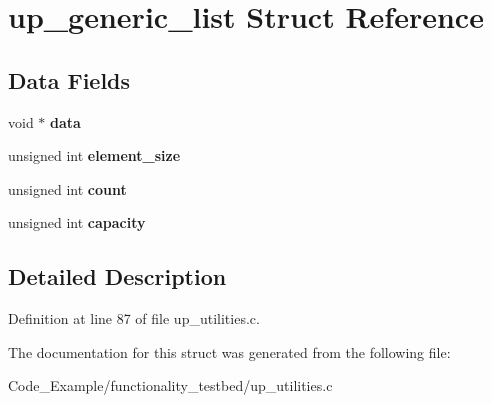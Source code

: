 \hypertarget{structup__generic__list}{}\section{up\+\_\+generic\+\_\+list Struct Reference}
\label{structup__generic__list}
\subsection*{Data Fields}
\begin{DoxyCompactItemize}
\item 
\hypertarget{structup__generic__list_a735984d41155bc1032e09bece8f8d66d}{}void $\ast$ {\bfseries data}\label{structup__generic__list_a735984d41155bc1032e09bece8f8d66d}

\item 
\hypertarget{structup__generic__list_ae4d21d9bcec7a17129ac21131eda7f4b}{}unsigned int {\bfseries element\+\_\+size}\label{structup__generic__list_ae4d21d9bcec7a17129ac21131eda7f4b}

\item 
\hypertarget{structup__generic__list_a16ff2d8e15ade4948398b0aeb80124a8}{}unsigned int {\bfseries count}\label{structup__generic__list_a16ff2d8e15ade4948398b0aeb80124a8}

\item 
\hypertarget{structup__generic__list_a21e93dea02fd068ae122115cb7011502}{}unsigned int {\bfseries capacity}\label{structup__generic__list_a21e93dea02fd068ae122115cb7011502}

\end{DoxyCompactItemize}


\subsection{Detailed Description}


Definition at line 87 of file up\+\_\+utilities.\+c.



The documentation for this struct was generated from the following file\+:\begin{DoxyCompactItemize}
\item 
Code\+\_\+\+Example/functionality\+\_\+testbed/up\+\_\+utilities.\+c\end{DoxyCompactItemize}
